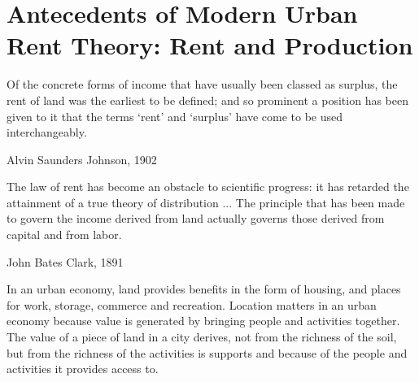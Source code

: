 \chapter{Antecedents of Modern Urban Rent Theory: Rent and Production} \label{chapter-rent}

\epigraph{Of the concrete forms of income that have usually been classed as surplus, the rent of land was the earliest to be defined; and so prominent a position has been given to it that the terms `rent' and `surplus' have come to be used interchangeably.}{Alvin Saunders Johnson, 1902 \cite{johnsonRentModernEconomic1902}}
\epigraph{The law of rent has become an obstacle to scientific progress: it has retarded the attainment of a true theory of distribution ... %
The principle that has been made to govern the income derived from land actually governs those derived from capital and from labor. 
}{John Bates Clark, 1891 \cite{clarkDistributionDeterminedLaw1891}}






In an urban economy, land provides benefits in the form of housing, and places for work, storage, commerce and recreation. Location matters in an urban economy because value is generated by bringing people and activities together. The value of a piece of land in a city derives, not from the richness of the soil, but from the richness of the activities is supports and because of the people and activities it provides access to.   

